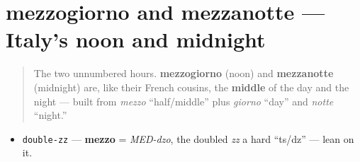 \section[mezzogiorno, mezzanotte]{mezzogiorno and mezzanotte — Italy's noon and midnight}

\label{lesson:IT-C08-mezzogiorno-mezzanotte}



\begin{quote}
The two unnumbered hours. \textbf{mezzogiorno} (noon) and \textbf{mezzanotte} (midnight) are, like their French cousins, the \textbf{middle} of the day and the night — built from \emph{mezzo} \textquotedblleft{}half/middle\textquotedblright{} plus \emph{giorno} \textquotedblleft{}day\textquotedblright{} and \emph{notte} \textquotedblleft{}night.\textquotedblright{}
\end{quote}

\begin{sounds}
\begin{itemize}
\raggedright
  \item \texttt{double-zz} — \textbf{mezzo} = \emph{MED-dzo}, the doubled \emph{zz} a hard \textquotedblleft{}ts/dz\textquotedblright{} — lean on it.
\end{itemize}
\end{sounds}

